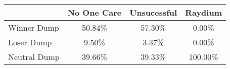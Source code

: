 \begin{tabular}{lccc}
\toprule
& No One Care & Unsucessful & Raydium \\
\midrule
Winner Dump & 50.84\% & 57.30\% & 0.00\% \\
Loser Dump & 9.50\% & 3.37\% & 0.00\% \\
Neutral Dump & 39.66\% & 39.33\% & 100.00\% \\
\bottomrule
\end{tabular}